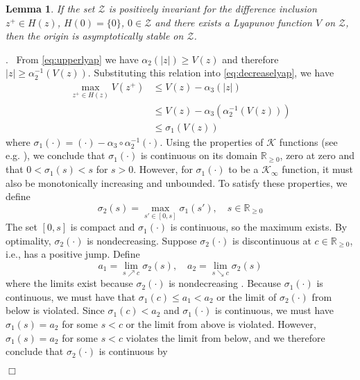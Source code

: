 \documentclass{article}
\newtheorem{lemma}{Lemma}
\newenvironment{proof}{\noindent {\em Proof}.\ }{\hspace*{\fill}$\Box$\medskip\\}
\newcommand{\abs}[1]{\left\lvert #1 \right\rvert}
\begin{document}
\begin{lemma}
If the set $\mathcal{Z}$ is positively invariant for the difference 
inclusion $z^+ \in H(z)$, $H(0) = \{0\}$, $0 \in \mathcal{Z}$ 
and there exists a Lyapunov function $V$ on $\mathcal{Z}$, then the 
origin is asymptotically stable on $\mathcal{Z}$.
\end{lemma}
\begin{proof}
From \eqref{eq:upperlyap} we have $\alpha_2(\abs{z}) \geq V(z)$ and therefore 
$\abs{z} \geq \alpha_2^{-1}(V(z))$.
Substituting this relation into \eqref{eq:decreaselyap}, we have
\begin{align*}
\max_{z^+ \in H(z)} V(z^+) &\leq V(z) - \alpha_3(\abs{z}) \\
&\leq V(z) - \alpha_3(\alpha_2^{-1}(V(z))) \\
&\leq \sigma_1(V(z))
\end{align*}
where $\sigma_1(\cdot) = (\cdot) - \alpha_3 \circ \alpha_2^{-1} (\cdot)$. Using the properties of
$\mathcal{K}$ functions (see e.g. \citep{khalil:2002}), we conclude that $\sigma_1(\cdot)$ is continuous
on its domain $\mathbb{R}_{\geq 0}$, zero at zero and that $0 < \sigma_1(s) < s$ for $s > 0$. However, for 
$\sigma_1(\cdot)$ to be a $\mathcal{K}_\infty$ function, it must also be monotonically increasing and unbounded.
To satisfy these properties, we define
\begin{equation*}
\sigma_2(s) = \max_{s' \in [0,s]} \sigma_1(s'), \quad s \in \mathbb{R}_{\geq 0}
\end{equation*}
The set $[0,s]$ is compact and $\sigma_1(\cdot)$ is continuous, so the maximum exists. By optimality, 
$\sigma_2(\cdot)$ is nondecreasing. Suppose $\sigma_2(\cdot)$ is discontinuous at $c \in \mathbb{R}_{\geq 0}$, 
i.e., has a positive jump. Define
\begin{equation*}
a_1 = \lim_{s \nearrow c} \sigma_2(s), \quad a_2 = \lim_{s \searrow c} \sigma_2(s)
\end{equation*}
where the limits exist because $\sigma_2(\cdot)$ is nondecreasing \cite[p. 149-150]{bartle:sherbert:2000}.
Because $\sigma_1(\cdot)$ is continuous, we must have that $\sigma_1(c) \leq a_1 < a_2$ or the limit of 
$\sigma_2(\cdot)$ from below is violated. Since $\sigma_1(c) < a_2$ and $\sigma_1(\cdot)$ is continuous, we must 
have $\sigma_1(s) = a_2$ for some $s < c$ or the limit from above is violated. However, $\sigma_1(s) = a_2$ 
for some $s < c$ violates the limit from below, and we therefore conclude that $\sigma_2(\cdot)$ is continuous by

\end{proof}
\end{document}

